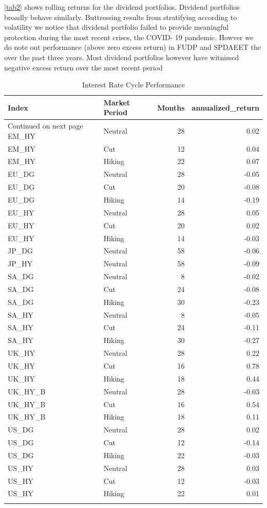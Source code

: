 \documentclass[11pt,preprint, authoryear]{elsarticle}
\numberwithin{equation}{section}
\numberwithin{figure}{section}
\numberwithin{table}{section}
\begin{document}
\ref{tab2} shows rolling returns for the dividend portfolios. Dividend
portfolios broadly behave similarly. Buttressing results from
stratifying according to volatility we notice that dividend portfolio
failed to provide meaningful protection during the most recent crises,
the COVID- 19 pandemic. Howver we do note out performance (above zero
excess return) in FUDP and SPDAEET the over the past three years. Most
dividend portfolios however have witnissed negative excess return over
the most recent period

\begingroup\fontsize{12pt}{13pt}\selectfont
\begin{longtable}{llrr}
  \toprule
Index & Market Period & Months & annualized\_return \\ 
  \hline 
\endhead 
\hline 
{\footnotesize Continued on next page} 
\endfoot 
\endlastfoot 
 \midrule
EM\_HY & Neutral &  28 & 0.02 \\ 
  EM\_HY & Cut &  12 & 0.04 \\ 
  EM\_HY & Hiking &  22 & 0.07 \\ 
  EU\_DG & Neutral &  28 & -0.05 \\ 
  EU\_DG & Cut &  20 & -0.08 \\ 
  EU\_DG & Hiking &  14 & -0.19 \\ 
  EU\_HY & Neutral &  28 & 0.05 \\ 
  EU\_HY & Cut &  20 & 0.02 \\ 
  EU\_HY & Hiking &  14 & -0.03 \\ 
  JP\_DG & Neutral &  58 & -0.06 \\ 
  JP\_HY & Neutral &  58 & -0.09 \\ 
  SA\_DG & Neutral &   8 & -0.02 \\ 
  SA\_DG & Cut &  24 & -0.08 \\ 
  SA\_DG & Hiking &  30 & -0.23 \\ 
  SA\_HY & Neutral &   8 & -0.05 \\ 
  SA\_HY & Cut &  24 & -0.11 \\ 
  SA\_HY & Hiking &  30 & -0.27 \\ 
  UK\_HY & Neutral &  28 & 0.22 \\ 
  UK\_HY & Cut &  16 & 0.78 \\ 
  UK\_HY & Hiking &  18 & 0.44 \\ 
  UK\_HY\_B & Neutral &  28 & -0.03 \\ 
  UK\_HY\_B & Cut &  16 & 0.54 \\ 
  UK\_HY\_B & Hiking &  18 & 0.11 \\ 
  US\_DG & Neutral &  28 & 0.02 \\ 
  US\_DG & Cut &  12 & -0.14 \\ 
  US\_DG & Hiking &  22 & -0.03 \\ 
  US\_HY & Neutral &  28 & 0.03 \\ 
  US\_HY & Cut &  12 & -0.03 \\ 
  US\_HY & Hiking &  22 & 0.01 \\ 
   \bottomrule
\caption{Interest Rate Cycle Performance} 
\end{longtable}
\endgroup
\end{document}
